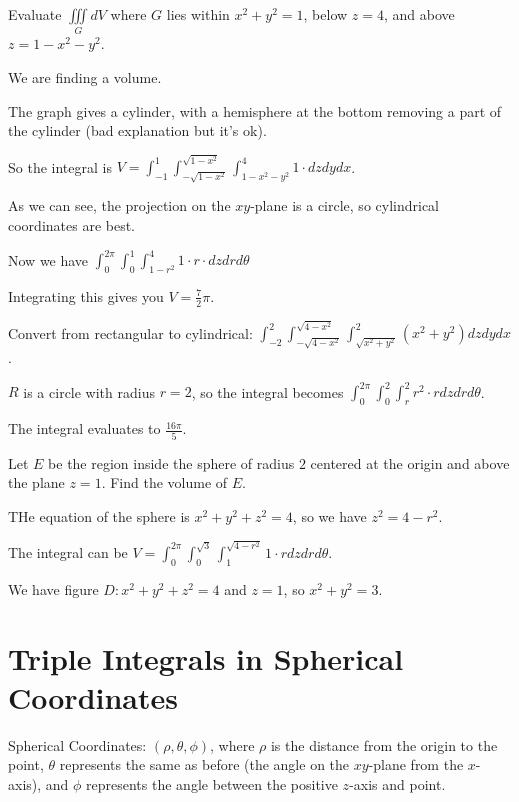 \documentclass[../calc3.tex]{subfiles}
\begin{document}
\begin{example}
    Evaluate $\iiint\limits_{G} dV$ where $G$ lies within $x^2+y^2=1$, below $z=4$, and above $z=1-x^2-y^2$.

    We are finding a volume.

    The graph gives a cylinder, with a hemisphere at the bottom removing a part of the cylinder (bad explanation but it's ok).

    So the integral is $V=\int_{-1}^1 \int_{-\sqrt{1-x^2}}^{\sqrt{1-x^2}} \int_{1-x^2-y^2}^4 1\cdot dz dy dx$.

    As we can see, the projection on the $xy$-plane is a circle, so cylindrical coordinates are best.

    Now we have $\int_0^{2\pi} \int_0^1 \int_{1-r^2}^4 1\cdot r\cdot dz dr d\theta$

    Integrating this gives you $V=\frac{7}{2}\pi$.
\end{example}

\begin{example}
    Convert from rectangular to cylindrical: $\int_{-2}^2 \int_{-\sqrt{4-x^2}}^{\sqrt{4-x^2}}\int_{\sqrt{x^2+y^2}}^2 (x^2+y^2)dzdydx$.

    $R$ is a circle with radius $r=2$, so the integral becomes $\int_0^{2\pi}\int_0^2 \int_r^2 r^2\cdot r dz dr d\theta$.

    The integral evaluates to $\frac{16\pi}{5}$.
\end{example}

\pagebreak
\begin{example}
    Let $E$ be the region inside the sphere of radius $2$ centered at the origin and above the plane $z=1$. Find the volume of $E$.

    THe equation of the sphere is $x^2+y^2+z^2=4$, so we have $z^2=4-r^2$.

    The integral can be $V=\int_0^{2\pi} \int_0^{\sqrt{3}} \int_1^{\sqrt{4-r^2}} 1\cdot r dz dr d\theta$.

    We have figure $D: x^2+y^2+z^2=4$ and $z=1$, so $x^2+y^2=3$.
\end{example}


\section{Triple Integrals in Spherical Coordinates}
Spherical Coordinates: $(\rho, \theta, \phi)$, where $\rho$ is the distance from the origin to the point, $\theta$ represents the same as before (the angle on the $xy$-plane from the $x$-axis), and $\phi$ represents the angle between the positive $z$-axis and point.
\end{document}

